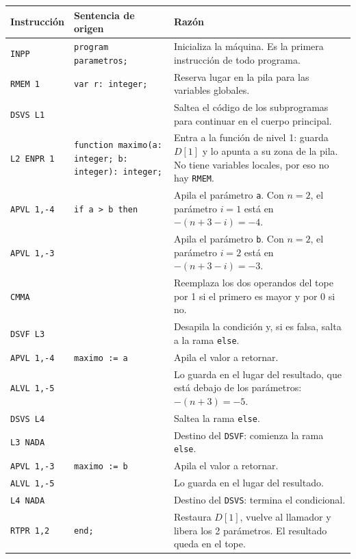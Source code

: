 \documentclass[12pt]{article}
\begin{document}
\begin{longtable}{|p{3.2cm}|p{5cm}|p{7cm}|}
\hline
\textbf{Instrucción} & \textbf{Sentencia de origen} & \textbf{Razón} \\
\hline
\endhead
\texttt{INPP} & \texttt{program parametros;} & Inicializa la máquina. Es la primera instrucción de todo programa. \\
\hline
\texttt{RMEM 1} & \texttt{var r: integer;} & Reserva lugar en la pila para las variables globales. \\
\hline
\texttt{DSVS L1} & \texttt{} & Saltea el código de los subprogramas para continuar en el cuerpo principal. \\
\hline
\texttt{L2 ENPR 1} & \texttt{function maximo(a: integer; b: integer): integer;} & Entra a la función de nivel 1: guarda $D[1]$ y lo apunta a su zona de la pila. No tiene variables locales, por eso no hay \texttt{RMEM}. \\
\hline
\texttt{APVL 1,-4} & \texttt{if a > b then} & Apila el parámetro \texttt{a}. Con $n=2$, el parámetro $i=1$ está en $-(n+3-i)=-4$. \\
\hline
\texttt{APVL 1,-3} & \texttt{} & Apila el parámetro \texttt{b}. Con $n=2$, el parámetro $i=2$ está en $-(n+3-i)=-3$. \\
\hline
\texttt{CMMA} & \texttt{} & Reemplaza los dos operandos del tope por 1 si el primero es mayor y por 0 si no. \\
\hline
\texttt{DSVF L3} & \texttt{} & Desapila la condición y, si es falsa, salta a la rama \texttt{else}. \\
\hline
\texttt{APVL 1,-4} & \texttt{maximo := a} & Apila el valor a retornar. \\
\hline
\texttt{ALVL 1,-5} & \texttt{} & Lo guarda en el lugar del resultado, que está debajo de los parámetros: $-(n+3)=-5$. \\
\hline
\texttt{DSVS L4} & \texttt{} & Saltea la rama \texttt{else}. \\
\hline
\texttt{L3 NADA} & \texttt{} & Destino del \texttt{DSVF}: comienza la rama \texttt{else}. \\
\hline
\texttt{APVL 1,-3} & \texttt{maximo := b} & Apila el valor a retornar. \\
\hline
\texttt{ALVL 1,-5} & \texttt{} & Lo guarda en el lugar del resultado. \\
\hline
\texttt{L4 NADA} & \texttt{} & Destino del \texttt{DSVS}: termina el condicional. \\
\hline
\texttt{RTPR 1,2} & \texttt{end;} & Restaura $D[1]$, vuelve al llamador y libera los 2 parámetros. El resultado queda en el tope. \\

\end{longtable}
\end{document}
